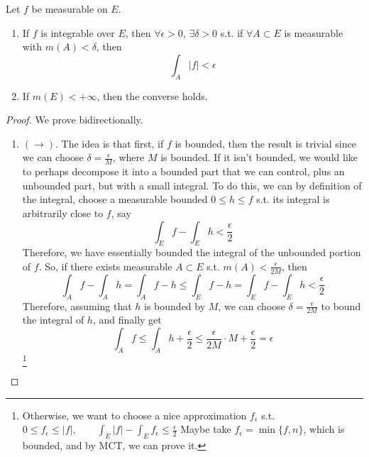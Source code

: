   \begin{theorem}
    Let $f$ be measurable on $E$. 
    \begin{enumerate}
      \item If $f$ is integrable over $E$, then $\forall \epsilon > 0$, $\exists \delta > 0$ s.t. if $\forall A \subset E$ is measurable with $m(A) < \delta$, then 
      \begin{equation}
        \int_A |f| < \epsilon
      \end{equation}

      \item If $m(E) < +\infty$, then the converse holds. 
    \end{enumerate}
  \end{theorem}
  \begin{proof}
    We prove bidirectionally. 
    \begin{enumerate}
      \item $(\rightarrow)$. The idea is that first, if $f$ is bounded, then the result is trivial since we can choose $\delta = \frac{\epsilon}{M}$, where $M$ is bounded. If it isn't bounded, we would like to perhaps decompose it into a bounded part that we can control, plus an unbounded part, but with a small integral. To do this, we can by definition of the integral, choose a measurable bounded $0 \leq h \leq f$ s.t. its integral is arbitrarily close to $f$, say 
      \begin{equation}
        \int_E f - \int_E h < \frac{\epsilon}{2}
      \end{equation}
      Therefore, we have essentially bounded the integral of the unbounded portion of $f$. So, if there exists measurable $A \subset E$ s.t. $m(A) < \frac{\epsilon}{2M}$, then 
      \begin{equation}
        \int_A f - \int_A h = \int_A f - h \leq \int_E f - h = \int_E f - \int_E h < \frac{\epsilon}{2}
      \end{equation}
      Therefore, assuming that $h$ is bounded by $M$, we can choose $\delta = \frac{\epsilon}{2M}$ to bound the integral of $h$, and finally get 
      \begin{equation}
        \int_A f \leq \int_A h + \frac{\epsilon}{2} \leq \frac{\epsilon}{2M} \cdot M + \frac{\epsilon}{2} = \epsilon
      \end{equation}
      \footnote{Otherwise, we want to choose a nice approximation $f_\epsilon$ s.t. $0 \leq f_\epsilon \leq |f|, \qquad \int_E |f| - \int_E f_\epsilon \leq \frac{\epsilon}{2}$ Maybe take $f_\epsilon = \min\{f, n\}$, which is bounded, and by MCT, we can prove it. }


\end{enumerate}
\end{proof}
